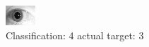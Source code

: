 \begin{figure}[h!]
\begin{center}
\includegraphics[width=0.60\columnwidth]{figures/ID1822_class_4_target_3.png}
\end{center}
\caption{ Classification: 4 actual target: 3}
\label{fig:ID1822_class_4_target_3}
\end{figure}
